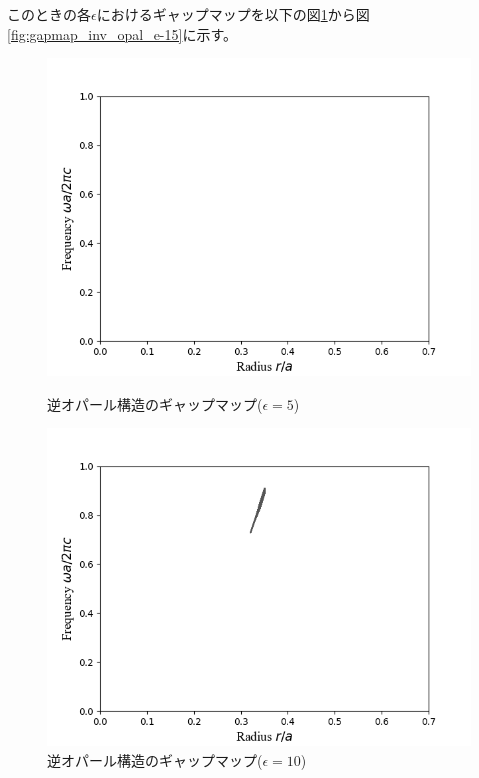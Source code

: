 \documentclass[platex,dvipdfmx]{jsreport}
\numberwithin{equation}{section}
\begin{document}
このときの各$\epsilon$におけるギャップマップを以下の図\ref{fig:gapmap_inv_opal_e-5}から図\ref{fig:gapmap_inv_opal_e-15}に示す。

\begin{figure}[h]
  \begin{minipage}[h]{0.5\linewidth}
    \centering
    \includegraphics[keepaspectratio, scale=0.45]{results/gap_map/inv_e-5.png}
    \caption{逆オパール構造のギャップマップ($\epsilon = 5$)}
    \label{fig:gapmap_inv_opal_e-5}
  \end{minipage}
  \begin{minipage}[h]{0.5\linewidth}
    \centering
    \includegraphics[keepaspectratio, scale=0.45]{results/gap_map/inv_e-10.png}
    \caption{逆オパール構造のギャップマップ($\epsilon = 10$)}

\end{minipage}
\end{figure}
\end{document}

